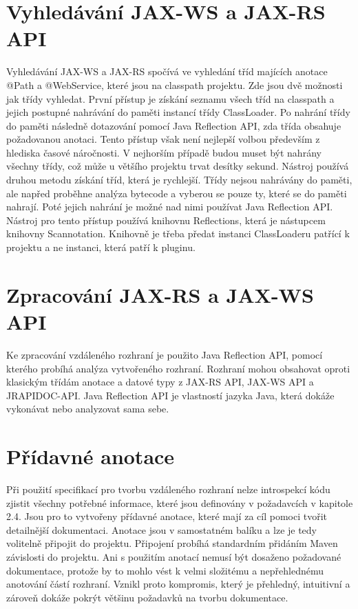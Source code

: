 \documentclass[11pt,twoside,a4paper]{book}
\begin{document}
\section{Vyhledávání JAX-WS a JAX-RS API}

Vyhledávání JAX-WS a JAX-RS spočívá ve vyhledání tříd majících anotace @Path a
@WebService, které jsou na classpath projektu. Zde jsou dvě možnosti jak třídy vyhledat.
První přístup je získání seznamu všech tříd na classpath a jejich postupné nahrávání do paměti
instancí třídy ClassLoader. Po nahrání třídy do paměti následně dotazování pomocí Java
Reflection API, zda třída obsahuje požadovanou anotaci. Tento přístup však není nejlepší
volbou především z hlediska časové náročnosti. V nejhorším případě budou muset být
nahrány všechny třídy, což může u většího projektu trvat desítky sekund. Nástroj používá
druhou metodu získání tříd, která je rychlejší. Třídy nejsou nahrávány do paměti, ale napřed
proběhne analýza bytecode a vyberou se pouze ty, které se do paměti nahrají. Poté jejich
nahrání je možné nad nimi používat Java Reflection API. Nástroj pro tento přístup používá
knihovnu Reflections, která je nástupcem knihovny Scannotation. Knihovně je třeba předat
instanci ClassLoaderu patřící k projektu a ne instanci, která patří k pluginu.

\section{Zpracování JAX-RS a JAX-WS API}

Ke zpracování vzdáleného rozhraní je použito Java Reflection API, pomocí kterého probíhá
analýza vytvořeného rozhraní. Rozhraní mohou obsahovat oproti klasickým třídám anotace a
datové typy z JAX-RS API, JAX-WS API a JRAPIDOC-API. Java Reflection API je
vlastností jazyka Java, která dokáže vykonávat nebo analyzovat sama sebe.

\section{Přídavné anotace}

Při použití specifikací pro tvorbu vzdáleného rozhraní nelze introspekcí kódu zjistit všechny
potřebné informace, které jsou definovány v požadavcích v kapitole 2.4. Jsou pro to
vytvořeny přídavné anotace, které mají za cíl pomoci tvořit detailnější dokumentaci. Anotace
jsou v samostatném balíku a lze je tedy volitelně připojit do projektu. Připojení probíhá
standardním přidáním Maven závislosti do projektu. Ani s použitím anotací nemusí být
dosaženo požadované dokumentace, protože by to mohlo vést k velmi složitému a
nepřehlednému anotování částí rozhraní. Vznikl proto kompromis, který je přehledný,
intuitivní a zároveň dokáže pokrýt většinu požadavků na tvorbu dokumentace.
\end{document}
